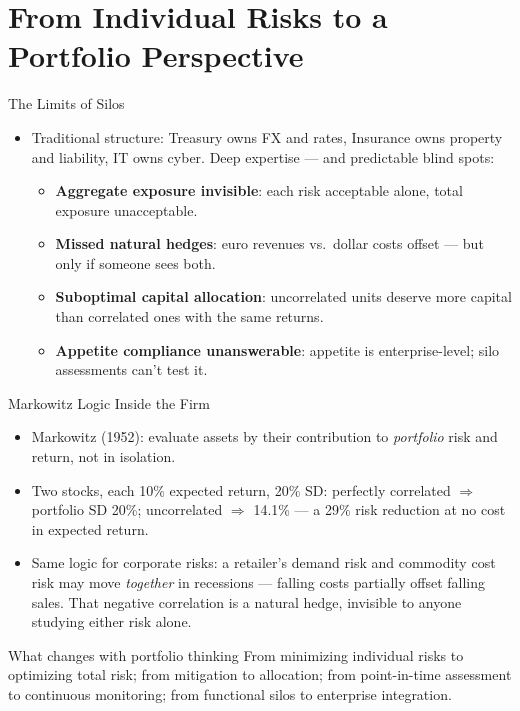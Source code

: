 \documentclass[11pt, aspectratio=169]{beamer}
\begin{document}
\section{From Individual Risks to a Portfolio Perspective}

\begin{frame}{The Limits of Silos}
\begin{itemize}
  \item Traditional structure: Treasury owns FX and rates, Insurance owns property and liability, IT owns cyber. Deep expertise --- and predictable blind spots:
  \begin{itemize}
    \item \textbf{Aggregate exposure invisible}: each risk acceptable alone, total exposure unacceptable.
    \item \textbf{Missed natural hedges}: euro revenues vs.\ dollar costs offset --- but only if someone sees both.
    \item \textbf{Suboptimal capital allocation}: uncorrelated units deserve more capital than correlated ones with the same returns.
    \item \textbf{Appetite compliance unanswerable}: appetite is enterprise-level; silo assessments can't test it.
  \end{itemize}
\end{itemize}
\end{frame}

\begin{frame}{Markowitz Logic Inside the Firm}
\begin{itemize}
  \item Markowitz (1952): evaluate assets by their contribution to \emph{portfolio} risk and return, not in isolation.
  \item Two stocks, each 10\% expected return, 20\% SD: perfectly correlated $\Rightarrow$ portfolio SD 20\%; uncorrelated $\Rightarrow$ 14.1\% --- a 29\% risk reduction at no cost in expected return.
  \item Same logic for corporate risks: a retailer's demand risk and commodity cost risk may move \emph{together} in recessions --- falling costs partially offset falling sales. That negative correlation is a \alert{natural hedge}, invisible to anyone studying either risk alone.
\end{itemize}
\medskip
\begin{block}{What changes with portfolio thinking}
From minimizing individual risks to optimizing total risk; from mitigation to allocation; from point-in-time assessment to continuous monitoring; from functional silos to enterprise integration.
\end{block}
\end{frame}
\end{document}
